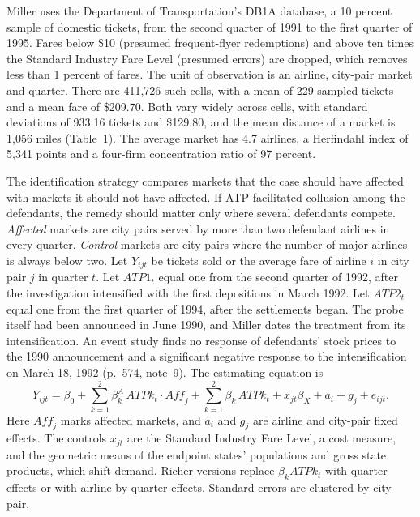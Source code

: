 Miller uses the Department of Transportation's DB1A database, a 10 percent sample of domestic tickets, from the
second quarter of 1991 to the first quarter of 1995. Fares below \$10 (presumed frequent-flyer redemptions) and
above ten times the Standard Industry Fare Level (presumed errors) are dropped, which removes less than 1 percent
of fares. The unit of observation is an airline, city-pair market and quarter. There are 411,726 such cells, with
a mean of 229 sampled tickets and a mean fare of \$209.70. Both vary widely across cells, with standard deviations
of 933.16 tickets and \$129.80, and the mean distance of a market is 1,056 miles (Table~1). The average market has
4.7 airlines, a Herfindahl index of 5,341 points and a four-firm concentration ratio of 97 percent.

The identification strategy compares markets that the case should have affected with markets it should not have
affected. If ATP facilitated collusion among the defendants, the remedy should matter only where several
defendants compete. \emph{Affected} markets are city pairs served by more than two defendant airlines in every
quarter. \emph{Control} markets are city pairs where the number of major airlines is always below two. Let
$Y_{ijt}$ be tickets sold or the average fare of airline $i$ in city pair $j$ in quarter $t$. Let
$\mathit{ATP1}_t$ equal one from the second quarter of 1992, after the investigation intensified with the first
depositions in March 1992. Let $\mathit{ATP2}_t$ equal one from the first quarter of 1994, after the settlements
began. The probe itself had been announced in June 1990, and Miller dates the treatment from its intensification.
An event study finds no response of defendants' stock prices to the 1990 announcement and a significant negative
response to the intensification on March 18, 1992 (p.~574, note~9). The estimating equation is
\begin{equation}\label{eq:13-miller-did}
  Y_{ijt} = \beta_0 + \sum_{k=1}^{2}\beta_{k}^{A}\,\mathit{ATPk}_t\cdot\mathit{Aff}_j
          + \sum_{k=1}^{2}\beta_{k}\,\mathit{ATPk}_t + x_{jt}\beta_X + a_i + g_j + e_{ijt} .
\end{equation}
Here $\mathit{Aff}_j$ marks affected markets, and $a_i$ and $g_j$ are airline and city-pair fixed effects. The
controls $x_{jt}$ are the Standard Industry Fare Level, a cost measure, and the geometric means of the endpoint
states' populations and gross state products, which shift demand. Richer versions replace $\beta_k\mathit{ATPk}_t$
with quarter effects or with airline-by-quarter effects. Standard errors are clustered by city pair.

